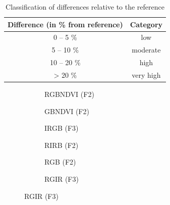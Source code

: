 \begin{table}[h]
\centering
\begin{tabular}{c c}
\hline
\textbf{Difference (in \% from reference)} & \textbf{Category} \\ \hline
0 -- 5 \%   & low \\ 
5 -- 10 \%  & moderate \\ 
10 -- 20 \% & high \\ 
> 20 \%     & very high \\ \hline
\end{tabular}
\caption{Classification of differences relative to the reference}
\label{tab:diff_cat}
\end{table}

\begin{figure}[htbp]
    \centering
    \begin{subfigure}{0.48\textwidth}
        \centering
        
        \caption{\acrshort{RGBNDVI} (F2)}
        \label{fig:perm_exp_diffM_rgbndvi_f2}
    \end{subfigure}
    \begin{subfigure}{0.48\textwidth}
        \centering
        
        \caption{\acrshort{GBNDVI} (F2)}
        \label{fig:perm_exp_diffM_gbndvi_f2}
    \end{subfigure}
    
    \begin{subfigure}{0.48\textwidth}
        \centering
        
        \caption{\acrshort{IRGB} (F3)}
        \label{fig:perm_exp_diffM_irgb_f3}
    \end{subfigure}
    \begin{subfigure}{0.48\textwidth}
        \centering
        
        \caption{\acrshort{RIRB} (F2)}
        \label{fig:perm_exp_diffM_RIRB_f2}
    \end{subfigure}
    
    \begin{subfigure}{0.48\textwidth}
        \centering
        
        \caption{\acrshort{RGB} (F2)}
        \label{fig:perm_exp_diffM_RGB_f2}
    \end{subfigure}
    \begin{subfigure}{0.48\textwidth}
        \centering
        
        \caption{\acrshort{RGIR} (F3)}
        \label{fig:perm_exp_diffM_RGIR_f3}
    \end{subfigure}


\end{figure}
